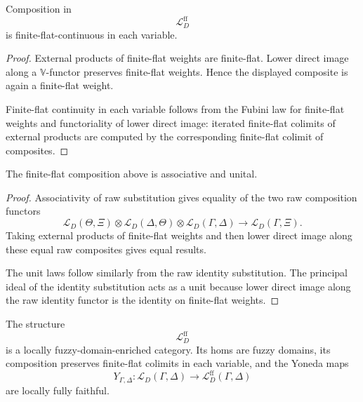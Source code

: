 \begin{lemma}
\label{lem:finite-flat-composition-syntactic-envelope}
Composition in
\[
    \mathcal L_D^{\mathrm{ff}}
\]
is finite-flat-continuous in each variable.
\end{lemma}

\begin{proof}
External products of finite-flat weights are finite-flat.  Lower direct image
along a \(\mathbb V\)-functor preserves finite-flat weights.  Hence the
displayed composite is again a finite-flat weight.

Finite-flat continuity in each variable follows from the Fubini law for
finite-flat weights and functoriality of lower direct image:
iterated finite-flat colimits of external products are computed by the
corresponding finite-flat colimit of composites.
\end{proof}

\begin{lemma}
\label{lem:associativity-units-finite-flat-envelope}
The finite-flat composition above is associative and unital.
\end{lemma}

\begin{proof}
Associativity of raw substitution gives equality of the two raw composition
functors
\[
    \mathcal L_D(\Theta,\Xi)\otimes
    \mathcal L_D(\Delta,\Theta)\otimes
    \mathcal L_D(\Gamma,\Delta)
    \longrightarrow
    \mathcal L_D(\Gamma,\Xi).
\]
Taking external products of finite-flat weights and then lower direct image
along these equal raw composites gives equal results.

The unit laws follow similarly from the raw identity substitution.  The
principal ideal of the identity substitution acts as a unit because lower
direct image along the raw identity functor is the identity on finite-flat
weights.
\end{proof}

\begin{theorem}
\label{thm:finite-flat-syntactic-envelope}
The structure
\[
    \mathcal L_D^{\mathrm{ff}}
\]
is a locally fuzzy-domain-enriched category.  Its homs are fuzzy domains, its
composition preserves finite-flat colimits in each variable, and the Yoneda
maps
\[
    Y_{\Gamma,\Delta}:
    \mathcal L_D(\Gamma,\Delta)
    \to
    \mathcal L_D^{\mathrm{ff}}(\Gamma,\Delta)
\]
are locally fully faithful.
\end{theorem}

